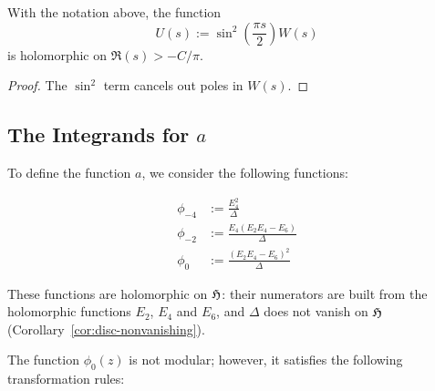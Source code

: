 \begin{proposition}\label{prop:sinsq-laplace-continuation}
    With the notation above, the function
    \[
    U(s) := \sin^2\left(\frac{\pi s}{2}\right) W(s)
    \]
    is holomorphic on $\Re(s) > -C/\pi$.
\end{proposition}
\begin{proof}
    The $\sin^2$ term cancels out poles in $W(s)$.
\end{proof}

\subsection{The Integrands for $a$}

To define the function $a$, we consider the following functions:
\begin{definition}\label{def:phi4-phi2-phi0}
\leanok
\begin{align}
    \phi_{-4} &:= \frac{E_4^2}{\Delta} \label{eqn: def phi4} \\
    \phi_{-2} &:= \frac{E_4(E_2 E_4 - E_6)}{\Delta} \label{eqn: def phi2} \\
    \phi_{0} &:= \frac{(E_2 E_4 - E_6)^2}{\Delta} \label{eqn: def phi0}
\end{align}
\end{definition}

These functions are holomorphic on $\mathfrak{H}$: their numerators are built from the holomorphic functions $E_2$, $E_4$ and $E_6$, and $\Delta$ does not vanish on $\mathfrak{H}$ (Corollary~\ref{cor:disc-nonvanishing}).


The function $\phi_0(z)$ is not modular; however, it satisfies the following transformation rules:


